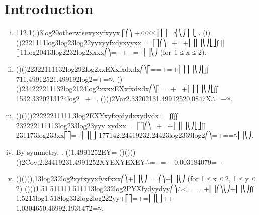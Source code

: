 \documentclass{article}
\author{kobriendublin }
\date{December 2018}
\begin{document}
\section{Introduction}
\begin{enumerate}[(i)]
\item 

112,1(,)3log20otherwisexyxyfxyyx⎧⎛⎞ +≤≤≤≤⎪⎜⎟=⎨⎝⎠⎪⎩ .
(i) ()2221111log3log23log22yyxyyfxdyxyyxx==⎡⎤⎛⎞=+=+⎜⎟⎢⎥⎝⎠⎣⎦∫
[][]11log20413log2232log2xxxx⎛⎞=−+−=+⎜⎟⎝⎠ (for 1 ≤ x ≤ 2).

\item  ()()22322111132log292log2xxEXxfxdxdx⎛⎞⎡==+=+⎜⎟ ⎢⎥⎝⎠⎣∫∫
711.49912521.499192log2=+=≈.
()()234222211132log2124log2xxxxEXxfxdxdx⎛⎞⎡==+=+⎜⎟ ⎢⎥⎝⎠⎣∫∫
1532.3320213124log2=+=.
()()2Var2.33202131.49912520.0847X∴=−≈.
\item ()()()22222211111,3log2EXYxyfxydydxxydydx==∫∫∫∫
232222111113log233log23yyy xydxx==⎡⎤⎛⎞=+=+⎜⎟⎢⎥⎝⎠⎣⎦∫∫
231173log233xx⎡⎤=+⎢⎥⎣⎦
177142.24419232.24423log2339log2⎛⎞=+==≈⎜⎟⎝⎠.
\item  By symmetry, . ()1.4991252EY=
()()()()2Cov,2.24419231.4991252XYEXYEXEY∴=−=−
0.003184079=−

\item ()()(),13log232log2xyfxyyxfyxfxxx⎛⎞+⎜⎟⎝⎠==⎛⎞+⎜⎟⎝⎠ (for 1 ≤ x ≤ 2, 1 ≤ y ≤ 2)
()()1.51.511111.511113log232log2PYXfydyydyy⎛⎞∴<===+⎜⎟⎛⎞⎝⎠+⎜⎟⎝⎠∫∫
1.5215log1.518log332log2log222yy+⎡⎤=+=⎢⎥⎣⎦++
1.0304650.46992.1931472=≈.
\end{enumerate}
\end{document}
